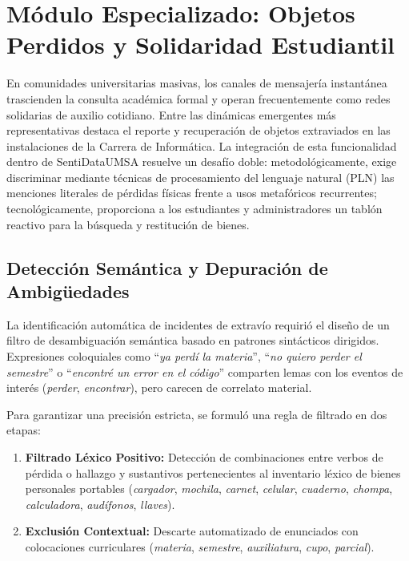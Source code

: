 \section{Módulo Especializado: Objetos Perdidos y Solidaridad Estudiantil}
\label{sec:objetos_perdidos}

En comunidades universitarias masivas, los canales de mensajería instantánea trascienden la consulta académica formal y operan frecuentemente como redes solidarias de auxilio cotidiano. Entre las dinámicas emergentes más representativas destaca el reporte y recuperación de objetos extraviados en las instalaciones de la Carrera de Informática. La integración de esta funcionalidad dentro de SentiDataUMSA resuelve un desafío doble: metodológicamente, exige discriminar mediante técnicas de procesamiento del lenguaje natural (PLN) las menciones literales de pérdidas físicas frente a usos metafóricos recurrentes; tecnológicamente, proporciona a los estudiantes y administradores un tablón reactivo para la búsqueda y restitución de bienes.

\subsection{Detección Semántica y Depuración de Ambigüedades}

La identificación automática de incidentes de extravío requirió el diseño de un filtro de desambiguación semántica basado en patrones sintácticos dirigidos. Expresiones coloquiales como ``\emph{ya perdí la materia}'', ``\emph{no quiero perder el semestre}'' o ``\emph{encontré un error en el código}'' comparten lemas con los eventos de interés (\textit{perder}, \textit{encontrar}), pero carecen de correlato material.

Para garantizar una precisión estricta, se formuló una regla de filtrado en dos etapas:
\begin{enumerate}[label=\arabic*)]
  \item \textbf{Filtrado Léxico Positivo:} Detección de combinaciones entre verbos de pérdida o hallazgo y sustantivos pertenecientes al inventario léxico de bienes personales portables (\textit{cargador}, \textit{mochila}, \textit{carnet}, \textit{celular}, \textit{cuaderno}, \textit{chompa}, \textit{calculadora}, \textit{audífonos}, \textit{llaves}).
  \item \textbf{Exclusión Contextual:} Descarte automatizado de enunciados con colocaciones curriculares (\textit{materia}, \textit{semestre}, \textit{auxiliatura}, \textit{cupo}, \textit{parcial}).
\end{enumerate}

